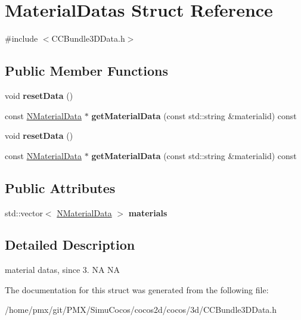 \hypertarget{structMaterialDatas}{}\section{Material\+Datas Struct Reference}
\label{structMaterialDatas}


{\ttfamily \#include $<$C\+C\+Bundle3\+D\+Data.\+h$>$}

\subsection*{Public Member Functions}
\begin{DoxyCompactItemize}
\item 
\mbox{\label{structMaterialDatas_ae119d79057212b5231236c35d9657549}} 
void {\bfseries reset\+Data} ()
\item 
\mbox{\label{structMaterialDatas_ad8278e39b86487a8eb4dc9be0506de0a}} 
const \hyperlink{structNMaterialData}{N\+Material\+Data} $\ast$ {\bfseries get\+Material\+Data} (const std\+::string \&materialid) const
\item 
\mbox{\label{structMaterialDatas_ae119d79057212b5231236c35d9657549}} 
void {\bfseries reset\+Data} ()
\item 
\mbox{\label{structMaterialDatas_ad8278e39b86487a8eb4dc9be0506de0a}} 
const \hyperlink{structNMaterialData}{N\+Material\+Data} $\ast$ {\bfseries get\+Material\+Data} (const std\+::string \&materialid) const
\end{DoxyCompactItemize}
\subsection*{Public Attributes}
\begin{DoxyCompactItemize}
\item 
\mbox{\label{structMaterialDatas_a39c1305a0f1f97e13af9ea2727088587}} 
std\+::vector$<$ \hyperlink{structNMaterialData}{N\+Material\+Data} $>$ {\bfseries materials}
\end{DoxyCompactItemize}


\subsection{Detailed Description}
material datas, since 3.  NA  NA 

The documentation for this struct was generated from the following file\+:\begin{DoxyCompactItemize}
\item 
/home/pmx/git/\+P\+M\+X/\+Simu\+Cocos/cocos2d/cocos/3d/C\+C\+Bundle3\+D\+Data.\+h\end{DoxyCompactItemize}
